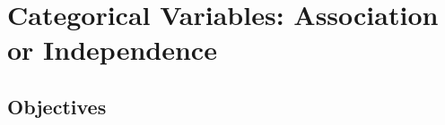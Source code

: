 \documentclass[11pt, chapterprefix=true]{scrbook}\usepackage[]{graphicx}\usepackage[]{color}
\begin{document}
\begin{exercises}
% 
%           
% 
% 
% 
% 


\end{exercises}


\onecolumn












\chapter{Categorical Variables: Association or Independence}
\label{chap:ch14}

\section{Objectives}
\end{document}
